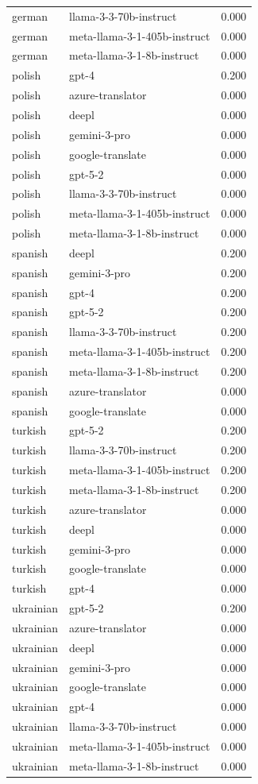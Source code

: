 \begin{tabular}{llr}
german & llama-3-3-70b-instruct & 0.000 \\
german & meta-llama-3-1-405b-instruct & 0.000 \\
german & meta-llama-3-1-8b-instruct & 0.000 \\
polish & gpt-4 & 0.200 \\
polish & azure-translator & 0.000 \\
polish & deepl & 0.000 \\
polish & gemini-3-pro & 0.000 \\
polish & google-translate & 0.000 \\
polish & gpt-5-2 & 0.000 \\
polish & llama-3-3-70b-instruct & 0.000 \\
polish & meta-llama-3-1-405b-instruct & 0.000 \\
polish & meta-llama-3-1-8b-instruct & 0.000 \\
spanish & deepl & 0.200 \\
spanish & gemini-3-pro & 0.200 \\
spanish & gpt-4 & 0.200 \\
spanish & gpt-5-2 & 0.200 \\
spanish & llama-3-3-70b-instruct & 0.200 \\
spanish & meta-llama-3-1-405b-instruct & 0.200 \\
spanish & meta-llama-3-1-8b-instruct & 0.200 \\
spanish & azure-translator & 0.000 \\
spanish & google-translate & 0.000 \\
turkish & gpt-5-2 & 0.200 \\
turkish & llama-3-3-70b-instruct & 0.200 \\
turkish & meta-llama-3-1-405b-instruct & 0.200 \\
turkish & meta-llama-3-1-8b-instruct & 0.200 \\
turkish & azure-translator & 0.000 \\
turkish & deepl & 0.000 \\
turkish & gemini-3-pro & 0.000 \\
turkish & google-translate & 0.000 \\
turkish & gpt-4 & 0.000 \\
ukrainian & gpt-5-2 & 0.200 \\
ukrainian & azure-translator & 0.000 \\
ukrainian & deepl & 0.000 \\
ukrainian & gemini-3-pro & 0.000 \\
ukrainian & google-translate & 0.000 \\
ukrainian & gpt-4 & 0.000 \\
ukrainian & llama-3-3-70b-instruct & 0.000 \\
ukrainian & meta-llama-3-1-405b-instruct & 0.000 \\
ukrainian & meta-llama-3-1-8b-instruct & 0.000 \\
\bottomrule
\end{tabular}
